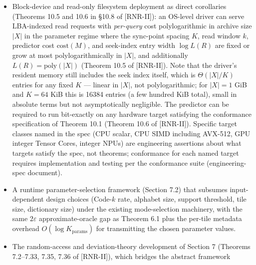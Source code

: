 \documentclass[
]{article}
\begin{document}
\begin{itemize}
  $\Theta(W)$ per token; lookup-table predictors over $\Sigma^W$
  have $\Theta(\sigma^W) = N^{\Theta(1)}$ \emph{model storage} so
  are excluded by model size, even though their per-evaluation
  lookup is $O(1)$).
  The sync-point compression overhead for natural data is estimated
  in §10.7; a tight worst-case bound in general is not proved. The
  comparison to existing neural compressors (NNCP-style autoregressive
  byte models, block-decoding latent-variable schemes) on either seek
  capability or ratio is empirical and is the subject of §11.
\item
  Block-device and read-only filesystem deployment as direct
  corollaries (Theorems 10.5 and 10.6 in §10.8 of [RNR-II]): an OS-level driver
  can serve LBA-indexed read requests with \emph{per-query} cost
  polylogarithmic in archive size $|X|$ in the parameter regime
  where the sync-point spacing $K$, read window $k$, predictor cost
  $\mathrm{cost}(M)$, and seek-index entry width $\log L(R)$ are
  fixed or grow at most polylogarithmically in $|X|$, and
  additionally $L(R) = \mathrm{poly}(|X|)$ (Theorem 10.5 of [RNR-II]). Note
  that the driver's resident memory still includes the seek index
  itself, which is $\Theta(|X|/K)$ entries for any fixed $K$ ---
  linear in $|X|$, not polylogarithmic; for $|X| = 1$ GiB and
  $K = 64$ KiB this is 16384 entries (a few hundred KiB total),
  small in absolute terms but not asymptotically negligible. The
  predictor can
  be required to
  run bit-exactly on any hardware target satisfying the conformance
  specification of Theorem 10.1 (Theorem 10.6 of [RNR-II]). Specific target
  classes named in the spec (CPU scalar, CPU SIMD including
  AVX-512, GPU integer Tensor Cores, integer NPUs) are engineering
  assertions about what targets satisfy the spec, not theorems;
  conformance for each named target requires implementation and
  testing per the conformance suite (engineering-spec document).
\item
  A runtime parameter-selection framework (Section 7.2) that subsumes
  input-dependent design choices (Code-$k$ rate, alphabet size,
  support threshold, tile size, dictionary size) under the existing
  mode-selection machinery, with the same $2\varepsilon$
  approximate-oracle gap as Theorem 6.1 plus the per-tile metadata
  overhead $O(\log K_{\text{params}})$ for transmitting the chosen
  parameter values.
\item
  The random-access and deviation-theory development of Section 7
  (Theorems 7.2--7.33, 7.35, 7.36 of [RNR-II]), which bridges the abstract framework

\end{itemize}
\end{document}

